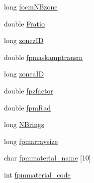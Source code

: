 \begin{DoxyCompactItemize}
long \hyperlink{structOPTPIAACMCDESIGN_af885127a147736127de2d00f0872f7d3}{focm\+N\+Bzone}
\item 
double \hyperlink{structOPTPIAACMCDESIGN_a8395925e8cc76395b3f4efa8132c290c}{Fratio}
\item 
long \hyperlink{structOPTPIAACMCDESIGN_a46c2ef78ec06d39b947a793d0a03dc28}{zonez\+I\+D}
\item 
double \hyperlink{structOPTPIAACMCDESIGN_a263a0425fe40eda25832b7490b8b0391}{fpmaskamptransm}
\item 
long \hyperlink{structOPTPIAACMCDESIGN_afdfb76344ee9a82f3a5790fcb602ade6}{zonea\+I\+D}
\item 
double \hyperlink{structOPTPIAACMCDESIGN_a96c58c0598cb36779f027aaadb62073d}{fpzfactor}
\item 
double \hyperlink{structOPTPIAACMCDESIGN_aa1794c4a0929583574e315a064a1c538}{fpm\+Rad}
\item 
long \hyperlink{structOPTPIAACMCDESIGN_ac59ca64b62c48d2b6717d31114dcbf71}{N\+Brings}
\item 
long \hyperlink{structOPTPIAACMCDESIGN_a02a2edaa7c78edec5ec36133783318a9}{fpmarraysize}
\item 
char \hyperlink{structOPTPIAACMCDESIGN_a229a4f5b2b0f11256ad6447aa7240c4a}{fpmmaterial\+\_\+name} \mbox{[}10\mbox{]}
\item 
int \hyperlink{structOPTPIAACMCDESIGN_a109986baab6ae4c894500a5f2e350677}{fpmmaterial\+\_\+code}
\end{DoxyCompactItemize}


